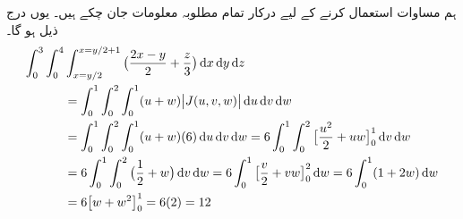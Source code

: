 ہم  مساوات  استعمال کرنے کے لیے درکار تمام  مطلوبہ معلومات جان چکے ہیں۔ یوں درج ذیل ہو گا۔
\begin{align*}
\int_0^3\int_0^4 & \int_{x=y/2}^{x=y/2+1}\big(\frac{2x-y}{2}+\frac{z}{3}\big)\dif x\dif y\dif z\\
&=\int_0^1\int_0^2\int_0^1(u+w)\abs{J(u,v,w)}\dif u\dif v\dif w\\
&=\int_0^1\int_0^2\int_0^1(u+w)(6)\dif u\dif v\dif w=6\int_0^1\int_0^2\big[\frac{u^2}{2}+uw\big]_0^1\dif v\dif w\\
&=6\int_0^1\int_0^2\big(\frac{1}{2}+w\big)\dif v\dif w=6\int_0^1\big[\frac{v}{2}+vw\big]_0^2\dif w=6\int_0^1(1+2w)\dif w\\
&=6\big[w+w^2\big]_0^1=6(2)=12
\end{align*}

